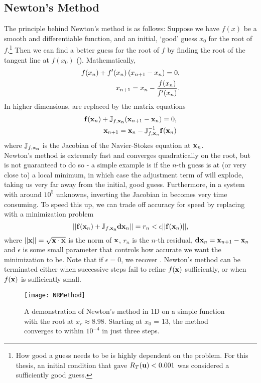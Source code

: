 \subsection{Newton's Method}
The principle behind Newton's method is as follows: Suppose we have $f(x)$ be a smooth and differentiable function, and an initial, `good' guess $x_0$ for the root of $f$.\footnote{How good a guess needs to be is highly dependent on the problem. For this thesis, an initial condition that gave $R_T(\mathbf{u}) < 0.001$ was considered a sufficiently good guess.}  Then we can find a better guess for the root of $f$ by finding the root of the tangent line at $f(x_0)$ (). Mathematically, 
\begin{align}
f(x_n) + f'(x_n)\left ( x_{n+1} - x_n \right ) = 0,\label{eq:NRS1D}\\ 
x_{n+1} = x_n - \dfrac{f(x_n)}{f'(x_n)}.\label{eq:NR1D}
\end{align}
In higher dimensions,  are replaced by the matrix equations
\begin{align}
\mathbf{f}(\mathbf{x}_n) + \mathbb{J}_{f,\mathbf{x_n}}(\mathbf{x}_{n+1} - \mathbf{x}_n) = 0,\label{eq:NRSND}\\
\mathbf{x}_{n+1} = \mathbf{x}_n - \mathbb{J}_{f,\mathbf{x}_n}^{-1}\mathbf{f}(\mathbf{x}_n)
\end{align}
where $\mathbb{J}_{f,\mathbf{x_n}}$ is the Jacobian of the Navier-Stokes equation at $\mathbf{x}_n$.\\
 
Newton's method is extremely fast and converges quadratically on the root, but is not guaranteed to do so - a simple example is if the $n$-th guess is at (or very close to) a local minimum, in which case the adjustment term of  will explode, taking us very far away from the initial, good guess. Furthermore, in a system with around $10^5$ unknowns, inverting the Jacobian in  becomes very time consuming. To speed this up, we can trade off accuracy for speed by replacing    with a minimization problem
\begin{equation}
||\mathbf{f}(\mathbf{x}_n) + \mathbb{J}_{f,\mathbf{x_n}}\mathbf{dx}_n|| = r_n< \epsilon ||\mathbf{f}(\mathbf{x}_n)||,
\end{equation}
where $||\mathbf{x}|| = \sqrt{\mathbf{x} \cdot \mathbf{x}}$ is the norm of $\mathbf{x}$, $r_n$ is the $n$-th residual, $\mathbf{dx}_n = \mathbf{x}_{n+1} - \mathbf{x}_n$ and $\epsilon$ is some small parameter that controls how accurate we want the minimization to be. Note that if $\epsilon = 0$, we recover . Newton's method can be terminated either when successive steps fail to refine $f(\mathbf{x})$ sufficiently, or when $f(\mathbf{x})$ is sufficiently small.
\begin{figure}[h]
\texttt{[image: NRMethod]}
\caption{A demonstration of Newton's method in 1D on a simple function with the root at $x_r \approx 8.98$. Starting at $x_0$ = 13, the method converges to within $10^{-4}$ in just three steps.}\label{fig:Newton}
\end{figure}  
